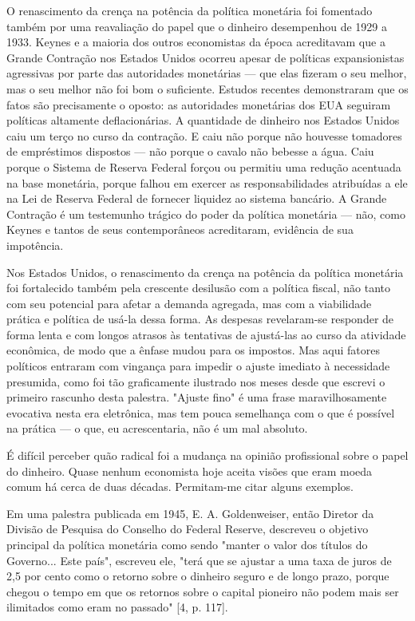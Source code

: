 \documentclass[12pt]{article}
\begin{document}
O renascimento da crença na potência da política monetária foi fomentado também por uma reavaliação do papel que o dinheiro desempenhou de 1929 a 1933. Keynes e a maioria dos outros economistas da época acreditavam que a Grande Contração nos Estados Unidos ocorreu apesar de políticas expansionistas agressivas por parte das autoridades monetárias — que elas fizeram o seu melhor, mas o seu melhor não foi bom o suficiente. Estudos recentes demonstraram que os fatos são precisamente o oposto: as autoridades monetárias dos EUA seguiram políticas altamente deflacionárias. A quantidade de dinheiro nos Estados Unidos caiu um terço no curso da contração. E caiu não porque não houvesse tomadores de empréstimos dispostos — não porque o cavalo não bebesse a água. Caiu porque o Sistema de Reserva Federal forçou ou permitiu uma redução acentuada na base monetária, porque falhou em exercer as responsabilidades atribuídas a ele na Lei de Reserva Federal de fornecer liquidez ao sistema bancário. A Grande Contração é um testemunho trágico do poder da política monetária — não, como Keynes e tantos de seus contemporâneos acreditaram, evidência de sua impotência.

Nos Estados Unidos, o renascimento da crença na potência da política monetária foi fortalecido também pela crescente desilusão com a política fiscal, não tanto com seu potencial para afetar a demanda agregada, mas com a viabilidade prática e política de usá-la dessa forma. As despesas revelaram-se responder de forma lenta e com longos atrasos às tentativas de ajustá-las ao curso da atividade econômica, de modo que a ênfase mudou para os impostos. Mas aqui fatores políticos entraram com vingança para impedir o ajuste imediato à necessidade presumida, como foi tão graficamente ilustrado nos meses desde que escrevi o primeiro rascunho desta palestra. "Ajuste fino" é uma frase maravilhosamente evocativa nesta era eletrônica, mas tem pouca semelhança com o que é possível na prática — o que, eu acrescentaria, não é um mal absoluto.

É difícil perceber quão radical foi a mudança na opinião profissional sobre o papel do dinheiro. Quase nenhum economista hoje aceita visões que eram moeda comum há cerca de duas décadas. Permitam-me citar alguns exemplos.

Em uma palestra publicada em 1945, E. A. Goldenweiser, então Diretor da Divisão de Pesquisa do Conselho do Federal Reserve, descreveu o objetivo principal da política monetária como sendo "manter o valor dos títulos do Governo... Este país", escreveu ele, "terá que se ajustar a uma taxa de juros de 2,5 por cento como o retorno sobre o dinheiro seguro e de longo prazo, porque chegou o tempo em que os retornos sobre o capital pioneiro não podem mais ser ilimitados como eram no passado" [4, p. 117].
\end{document}
